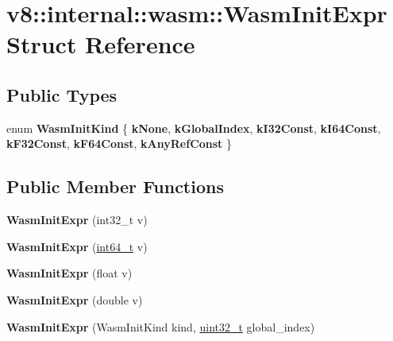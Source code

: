\hypertarget{structv8_1_1internal_1_1wasm_1_1WasmInitExpr}{}\section{v8\+:\+:internal\+:\+:wasm\+:\+:Wasm\+Init\+Expr Struct Reference}
\label{structv8_1_1internal_1_1wasm_1_1WasmInitExpr}
\subsection*{Public Types}
\begin{DoxyCompactItemize}
\item 
\mbox{\label{structv8_1_1internal_1_1wasm_1_1WasmInitExpr_a0af42ba84db5aa9dee81706a562051f7}} 
enum {\bfseries Wasm\+Init\+Kind} \{ \newline
{\bfseries k\+None}, 
{\bfseries k\+Global\+Index}, 
{\bfseries k\+I32\+Const}, 
{\bfseries k\+I64\+Const}, 
\newline
{\bfseries k\+F32\+Const}, 
{\bfseries k\+F64\+Const}, 
{\bfseries k\+Any\+Ref\+Const}
 \}
\end{DoxyCompactItemize}
\subsection*{Public Member Functions}
\begin{DoxyCompactItemize}
\item 
\mbox{\label{structv8_1_1internal_1_1wasm_1_1WasmInitExpr_a7758815bd7f10a8e2d9231faa204e662}} 
{\bfseries Wasm\+Init\+Expr} (int32\+\_\+t v)
\item 
\mbox{\label{structv8_1_1internal_1_1wasm_1_1WasmInitExpr_a91e344cfd46b715775f52d3530ec0c75}} 
{\bfseries Wasm\+Init\+Expr} (\mbox{\hyperlink{classint64__t}{int64\+\_\+t}} v)
\item 
\mbox{\label{structv8_1_1internal_1_1wasm_1_1WasmInitExpr_af321a532da4b498cf8cee8dc300d7988}} 
{\bfseries Wasm\+Init\+Expr} (float v)
\item 
\mbox{\label{structv8_1_1internal_1_1wasm_1_1WasmInitExpr_ae715563543540bcfc6188ab74928e07f}} 
{\bfseries Wasm\+Init\+Expr} (double v)
\item 
\mbox{\label{structv8_1_1internal_1_1wasm_1_1WasmInitExpr_abceb08bd20cff87cae2a8b06f7b5b2a4}} 
{\bfseries Wasm\+Init\+Expr} (Wasm\+Init\+Kind kind, \mbox{\hyperlink{classuint32__t}{uint32\+\_\+t}} global\+\_\+index)
\end{DoxyCompactItemize}
